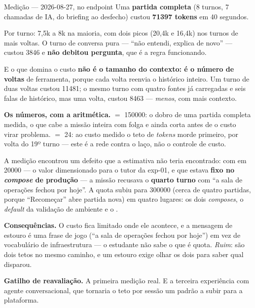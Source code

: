 \begin{especificacao}{Medição --- 2026-08-27,  no endpoint }
Uma \textbf{partida completa} (8 turnos, 7 chamadas de IA, do briefing ao
desfecho) custou \textbf{\num{71397} tokens} em 40 segundos.

Por turno: 7,5k a 8k na maioria, com dois picos (20,4k e 16,4k) nos turnos de
mais voltas. O turno de conversa pura --- \enquote{não entendi, explica de
novo} --- custou \num{3846} e \textbf{não debitou pergunta}, que é a regra
funcionando.

E o que domina o custo \textbf{não é o tamanho do contexto: é o número de
voltas} de ferramenta, porque cada volta reenvia o histórico inteiro. Um turno de
duas voltas custou \num{11481}; o mesmo turno com quatro fontes já carregadas e
seis falas de histórico, mas uma volta, custou \num{8463} --- \emph{menos}, com
mais contexto.
\end{especificacao}

\textbf{Os números, com a aritmética.}  $=$ \num{150000}:
o dobro de uma partida completa medida, o que cabe a missão inteira com folga e
ainda corta antes de o custo virar problema.  $=$ 24:
ao custo medido o teto de \emph{tokens} morde primeiro, por volta do 19º turno ---
este é a rede contra o laço, não o controle de custo.

\begin{atencao}
A medição encontrou um defeito que a estimativa não teria encontrado: com
 em \num{20000} --- o valor dimensionado
para o tutor da exp-01, e que estava \textbf{fixo no \emph{compose} de
produção} --- a missão recusava o \textbf{quarto turno} com \enquote{a sala de
operações fechou por hoje}. A quota subiu para \num{300000} (cerca de quatro
partidas, porque \enquote{Recomeçar} abre partida nova) em quatro lugares: os dois
\emph{composes}, o \emph{default} da validação de ambiente e o
.
\end{atencao}

\textbf{Consequências.} O custo fica limitado onde ele acontece, e a mensagem de
estouro é uma frase de jogo (\enquote{a sala de operações fechou por hoje}) em vez
de vocabulário de infraestrutura --- o estudante não sabe o que é quota. \emph{Ruim}:
são dois tetos no mesmo caminho, e um estouro exige olhar os dois para saber qual
disparou.

\textbf{Gatilho de reavaliação.} A primeira medição real. E a terceira
experiência com agente conversacional, que tornaria o teto por sessão um padrão a
subir para a plataforma.

